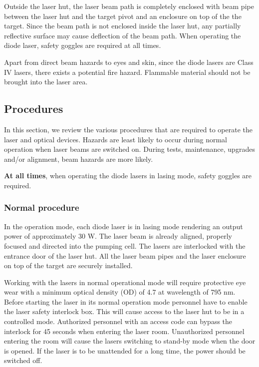 Outside the laser hut, the laser beam path is completely enclosed with beam 
pipe between the laser hut and the target pivot and an enclosure on top of the 
the target. 
Since the beam path is not enclosed inside the laser hut, any partially
reflective surface may cause deflection of the beam path. When operating the 
diode laser, safety goggles are required at all times.  

Apart from direct beam hazards to eyes and skin, since the diode lasers are 
Class IV lasers, there exists a potential fire hazard. Flammable material 
should not be brought into the laser area.  

\subsection{Procedures}

In this section, we review the various procedures that are required to operate the
laser and optical devices. Hazards are least likely to occur during normal operation
when laser beams are switched on. During tests, maintenance,
upgrades and/or alignment,  beam hazards are more likely.

{\bf At all times}, when operating the diode lasers in lasing mode, safety goggles
are required.

\subsubsection{Normal procedure}
In the operation mode, each diode laser is in lasing mode rendering an output 
power of approximately 30 W. The laser beam is already aligned, properly 
focused and directed into the pumping cell. The lasers are interlocked with the
entrance door of the laser hut. All the laser beam pipes and the laser 
enclosure on top of the target are securely installed.

Working with the lasers in normal operational mode will require protective 
eye wear with a minimum optical 
density (OD) of 4.7 at wavelength of 795 nm. Before
starting the laser in its normal operation mode personnel have to enable the
laser safety interlock box. This will cause access to the laser hut to be in 
a controlled mode. Authorized personnel with an access code can 
bypass the interlock for 45 seconds when entering the laser room. Unauthorized
personnel entering the room will cause the lasers switching to stand-by mode
when the door is opened. If the laser is to be unattended for a long time, the 
power should be switched off.

